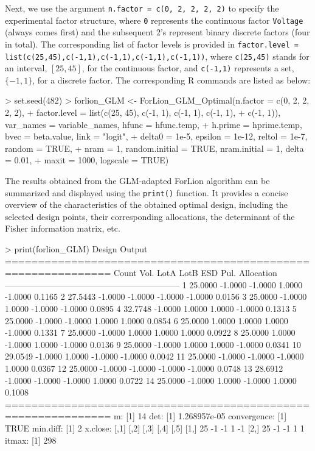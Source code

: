 Next, we use the argument \texttt{n.factor = c(0, 2, 2, 2, 2)} to specify the experimental factor structure, where {\tt 0} represents the continuous factor {\tt Voltage} (always comes first) and the subsequent $2$'s represent binary discrete factors (four in total). The corresponding list of factor levels is provided in \texttt{factor.level = list(c(25,45),c(-1,1),c(-1,1),c(-1,1),c(-1,1))}, where {\tt c(25,45)} stands for an interval, $[25, 45]$, for the continuous factor, and {\tt c(-1,1)} represents a set, $\{-1, 1\}$, for a discrete factor. The corresponding R commands are listed as below:
\begin{example}
>  set.seed(482)
>  forlion_GLM <- ForLion_GLM_Optimal(n.factor = c(0, 2, 2, 2, 2), 
+                 factor.level = list(c(25, 45), c(-1, 1), c(-1, 1), c(-1, 1), 
+                 c(-1, 1)), var_names = variable_names, hfunc = hfunc.temp, 
+                 h.prime = hprime.temp, bvec = beta.value, link = "logit", 
+                 delta0 = 1e-5, epsilon = 1e-12, reltol = 1e-7, random = TRUE, 
+                 nram = 1, random.initial = TRUE, nram.initial = 1, delta = 0.01, 
+                 maxit = 1000, logscale = TRUE)
\end{example}

The results obtained from the GLM-adapted ForLion algorithm can be summarized and displayed using the \texttt{print()} function. It provides a concise overview of the characteristics of the obtained optimal design, including the selected design points, their corresponding allocations, the determinant of the Fisher information matrix, etc. 
\begin{example}
> print(forlion_GLM)
Design Output
============================================================== 
Count  Vol.     LotA     LotB     ESD      Pul.     Allocation
-------------------------------------------------------------- 
1      25.0000  -1.0000  -1.0000   1.0000  -1.0000  0.1165
2      27.5443  -1.0000  -1.0000  -1.0000  -1.0000  0.0156
3      25.0000  -1.0000   1.0000  -1.0000  -1.0000  0.0895
4      32.7748  -1.0000   1.0000   1.0000  -1.0000  0.1313
5      25.0000  -1.0000  -1.0000   1.0000   1.0000  0.0854
6      25.0000   1.0000   1.0000   1.0000  -1.0000  0.1331
7      25.0000  -1.0000   1.0000   1.0000   1.0000  0.0922
8      25.0000   1.0000  -1.0000   1.0000  -1.0000  0.0136
9      25.0000  -1.0000   1.0000   1.0000  -1.0000  0.0341
10     29.0549  -1.0000   1.0000  -1.0000  -1.0000  0.0042
11     25.0000  -1.0000  -1.0000  -1.0000   1.0000  0.0367
12     25.0000  -1.0000  -1.0000  -1.0000  -1.0000  0.0748
13     28.6912  -1.0000  -1.0000  -1.0000   1.0000  0.0722
14     25.0000  -1.0000   1.0000  -1.0000   1.0000  0.1008
============================================================== 
m:
[1] 14
det:
[1] 1.268957e-05
convergence:
[1] TRUE
min.diff:
[1] 2
x.close:
     [,1] [,2] [,3] [,4] [,5]
[1,]   25   -1   -1    1   -1
[2,]   25   -1   -1    1    1
itmax:
[1] 298
\end{example}

